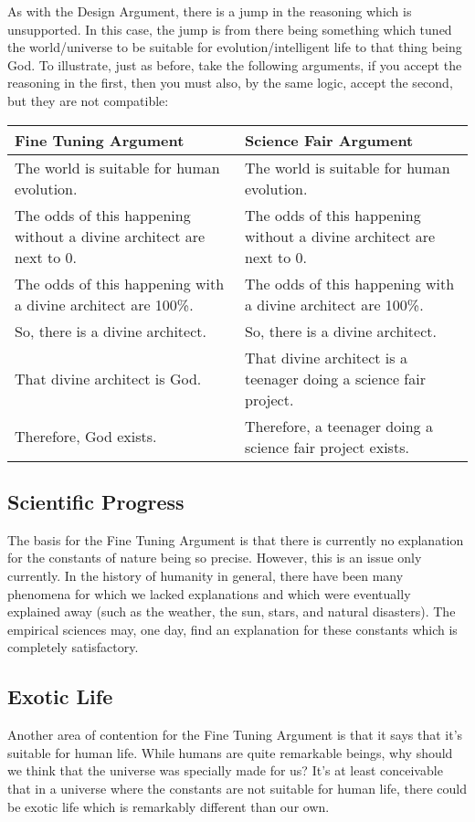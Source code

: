 As with the Design Argument, there is a jump in the reasoning which is unsupported. In this case, the jump is from there being something which tuned the world/universe to be suitable for evolution/intelligent life to that thing being God. To illustrate, just as before, take the following arguments, if you accept the reasoning in the first, then you must also, by the same logic, accept the second, but they are not compatible:
\noindent
\begin{tabular}{p{2.75in}|p{2.75in}}
Fine Tuning Argument&Science Fair Argument\\\hline
    The world is suitable for human evolution.&The world is suitable for human evolution.\\
    The odds of this happening without a divine architect are next to 0.& The odds of this happening without a divine architect are next to 0.\\
    The odds of this happening with a divine architect are 100\%.&The odds of this happening with a divine architect are 100\%.\\
    So, there is a divine architect.&So, there is a divine architect.\\
    That divine architect is God.&That divine architect is a teenager doing a science fair project.\\
    Therefore, God exists.&Therefore, a teenager doing a science fair project exists.\\
\end{tabular} 
\subsection{Scientific Progress}

The basis for the Fine Tuning Argument is that there is currently no explanation for the constants of nature being so precise. However, this is an issue only currently. In the history of humanity in general, there have been many phenomena for which we lacked explanations and which were eventually explained away (such as the weather, the sun, stars, and natural disasters). The empirical sciences may, one day, find an explanation for these constants which is completely satisfactory. 
\subsection{Exotic Life}

Another area of contention for the Fine Tuning Argument is that it says that it's suitable for human life. While humans are quite remarkable beings, why should we think that the universe was specially made for us? It's at least conceivable that in a universe where the constants are not suitable for human life, there could be exotic life which is remarkably different than our own. 

